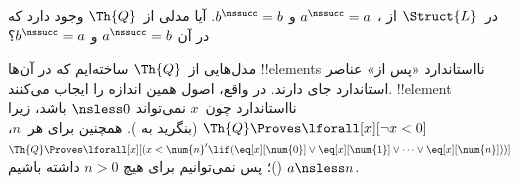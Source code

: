 \documentclass[../../../include/open-logic-section]{subfiles}
\begin{document}
\begin{prob}
در~$\Struct{L}$ از
،
$a^\nssucc = a$ و $b^\nssucc = b$. آیا مدلی از~$\Th{Q}$ وجود دارد
که در آن $a^\nssucc = b$ و $b^\nssucc = a$؟
\end{prob}

\begin{explain}
مدل‌هایی از~$\Th{Q}$ ساخته‌ایم که در آن‌ها !!{element}s نااستاندارد
«پس از» عناصر استاندارد جای دارند. در واقع، اصول همین اندازه را ایجاب
می‌کنند. !!{element} نااستاندارد چون~$x$ نمی‌تواند
${} \nsless 0$ باشد، زیرا
$\Th{Q} \Proves \lforall[x][\lnot x<0]$ (بنگرید به
). همچنین برای هر~$n$،
$\Th{Q} \Proves \lforall[x][(x < \num{n}' \lif
(\eq[x][\num{0}] \lor \eq[x][\num{1}] \lor \dots \lor
\eq[x][\num{n}]))]$ ()؛ پس
نمی‌توانیم برای هیچ $n>0$ داشته باشیم $a \nsless n$.
\end{explain}
\end{document}
